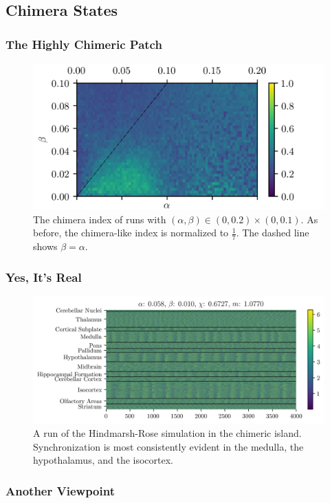\documentclass[hyperref={hidelinks}]{beamer}
\newcommand*{\hra}{\alpha}
\newcommand*{\hrb}{\beta}
\begin{document}
\subsection{Chimera States}
\begin{frame}
  \frametitle{The Highly Chimeric Patch}
  \begin{figure}[ht]
    \centering
    \includegraphics{figure/zoom_chimera}
    \caption[Zoomed landscape]{The chimera index of runs with $(\hra, \hrb) \in (0, 0.2) \times (0, 0.1)$.
      As before, the chimera-like index is normalized to $\frac{1}{7}$.
      The dashed line shows $\beta = \alpha$.
    }
    \label{fig:zoom_chimera}

  \end{figure}

\end{frame}

\begin{frame}
  \frametitle{Yes, It's Real}
  \begin{figure}[ht]
    \includegraphics[width=\textwidth]{figure/overhead-0_058-0_010}
    \caption[Highly chimeric simulation]{
      A run of the Hindmarsh-Rose simulation in the chimeric island.
      Synchronization is most consistently evident in the medulla, the hypothalamus, and the isocortex.
    }
    \label{fig:overhead_058_010}
  \end{figure}

\end{frame}
\begin{frame}
  \frametitle{Another Viewpoint}
  \centering
\end{frame}
\end{document}
